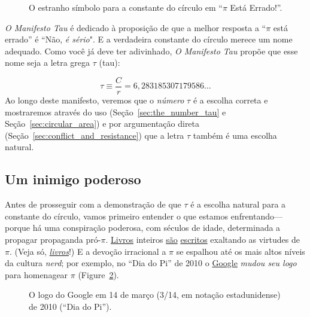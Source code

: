 \begin{figure}
\caption{O estranho símbolo para a constante do círculo em ``$\pi$ Está Errado!''.\label{fig:palais_tau}}
\end{figure}

\emph{O Manifesto Tau} é dedicado à proposição de que a melhor resposta a ``$\pi$ está errado'' é ``Não, \emph{é sério}". E a verdadeira constante do círculo merece um nome adequado. Como você já deve ter adivinhado, \emph{O Manifesto Tau} propõe que esse nome seja a letra grega $\tau$ (tau):

\begin{equation}
\label{eq:tau}
\tau \equiv \frac{C}{r} = 6,283185307179586\ldots
\end{equation}
Ao longo deste manifesto, veremos que o \emph{número} $\tau$ é a escolha correta e mostraremos através do uso (Seção~\ref{sec:the_number_tau} e Seção~\ref{sec:circular_area}) e por argumentação direta (Seção~\ref{sec:conflict_and_resistance}) que a letra $\tau$ também é uma escolha natural.

\subsection{Um inimigo poderoso} %
 \label{sec:a_powerful_enemy}

Antes de prosseguir com a demonstração de que $\tau$ é a escolha natural para a constante do círculo, vamos primeiro entender o que estamos enfrentando---porque há uma conspiração poderosa, com séculos de idade, determinada a propagar propaganda pró-$\pi$. \href{https://www.amazon.com/exec/obidos/ISBN=0802713327/parallaxproductiA/}{Livros} inteiros \href{https://www.amazon.com/Pi-Sky-Counting-Thinking-Being/dp/0198539568}{são} \href{https://www.amazon.com/exec/obidos/ISBN=0312381859/parallaxproductiA/}{escritos} exaltando as virtudes de $\pi$. (Veja só, \href{https://www.amazon.com/exec/obidos/ISBN=0387989463/parallaxproductiA/}{\emph{livros}}!) E a devoção irracional a $\pi$ se espalhou até os mais altos níveis da cultura \emph{nerd}; por exemplo, no ``Dia do Pi'' de 2010 o \href{https://www.google.com/}{Google} \emph{mudou seu logo} para homenagear $\pi$ (Figure~\ref{fig:google_pi_day.}).

\begin{figure}
\begin{center}
\end{center}
\caption{O logo do Google em 14 de março (3/14, em notação estadunidense) de 2010 (``Dia do Pi'').\label{fig:google_pi_day.}}
\end{figure}

